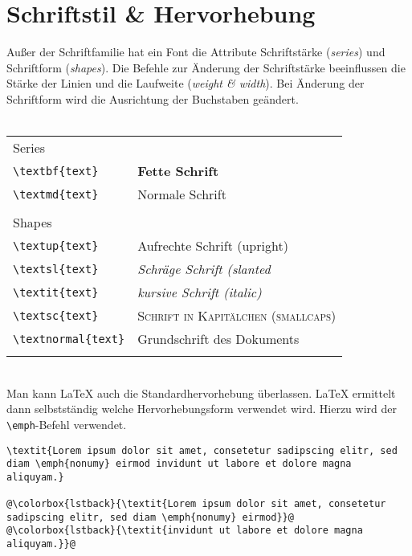 \section{Schriftstil \& Hervorhebung}
Außer der Schriftfamilie hat ein Font die Attribute Schriftstärke (\textit{series}) und Schriftform (\textit{shapes}). Die Befehle zur Änderung der Schriftstärke beeinflussen die Stärke der Linien und die Laufweite (\textit{weight \& width}). Bei Änderung der Schriftform wird die Ausrichtung der Buchstaben geändert.\\
\\
\begin{tabular}{ll}
\multicolumn{2}{l}{Series}\\
\verb=\textbf{text}=&\textbf{Fette Schrift}\\
\verb=\textmd{text}=&\textmd{Normale Schrift}\\
\\
\multicolumn{2}{l}{Shapes}\\
\verb=\textup{text}=&\textup{Aufrechte Schrift (upright)}\\
\verb=\textsl{text}=&\textsl{Schräge Schrift (slanted}\\
\verb=\textit{text}=&\textit{kursive Schrift (italic)}\\
\verb=\textsc{text}=&\textsc{Schrift in Kapitälchen (smallcaps)}\\
\verb=\textnormal{text}=&\textnormal{Grundschrift des Dokuments}\\
\\
\end{tabular}
\\
Man kann \LaTeX{} auch die Standardhervorhebung überlassen. \LaTeX{} ermittelt dann selbstständig welche Hervorhebungsform verwendet wird. Hierzu wird der \verb=\emph=-Befehl verwendet.\\
\begin{lstlisting}[caption={Emph-Hervorhebung}, escapechar=@, breaklines=true]
\textit{Lorem ipsum dolor sit amet, consetetur sadipscing elitr, sed
diam \emph{nonumy} eirmod invidunt ut labore et dolore magna aliquyam.}

@\colorbox{lstback}{\textit{Lorem ipsum dolor sit amet, consetetur sadipscing elitr, sed diam \emph{nonumy} eirmod}}@
@\colorbox{lstback}{\textit{invidunt ut labore et dolore magna aliquyam.}}@
\end{lstlisting}

